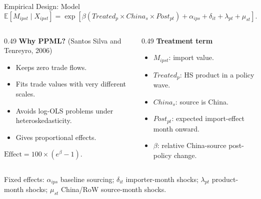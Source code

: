 \documentclass[aspectratio=169,11pt]{beamer}
\newcommand{\tightitem}{\setlength\itemsep{0.25em}}
\begin{document}
\begin{frame}{Empirical Design: Model}
  \vspace{-0.12cm}
  \[
  \mathbb{E}[M_{ipst}\mid X_{ipst}] =
  \exp\left[
  \beta (Treated_p \times China_s \times Post_{pt})
  + \alpha_{ips}+\delta_{it}+\lambda_{pt}+\mu_{st}
  \right].
  \]

  \vspace{-0.06cm}
  \begin{columns}[T,totalwidth=\textwidth]
    \begin{column}{0.49\textwidth}
      \small
      \textbf{Why PPML?}
      {\scriptsize (Santos Silva and Tenreyro, 2006)}
      \begin{itemize}
        \tightitem
        \item Keeps zero trade flows.
        \item Fits trade values with very different scales.
        \item Avoids log-OLS problems under heteroskedasticity.
        \item Gives proportional effects.
      \end{itemize}

      \vspace{0.08cm}
      \(\text{Effect}=100\times(e^\beta-1)\).
    \end{column}
    \begin{column}{0.49\textwidth}
      \small
      \textbf{Treatment term}
      \begin{itemize}
        \tightitem
        \item \(M_{ipst}\): import value.
        \item \(Treated_p\): HS product in a policy wave.
        \item \(China_s\): source is China.
        \item \(Post_{pt}\): expected import-effect month onward.
        \item \(\beta\): relative China-source post-policy change.
      \end{itemize}
    \end{column}
  \end{columns}

  \vspace{0.08cm}
  {\scriptsize Fixed effects: \(\alpha_{ips}\) baseline sourcing; \(\delta_{it}\) importer-month shocks; \(\lambda_{pt}\) product-month shocks; \(\mu_{st}\) China/RoW source-month shocks.}
\end{frame}
\end{document}
